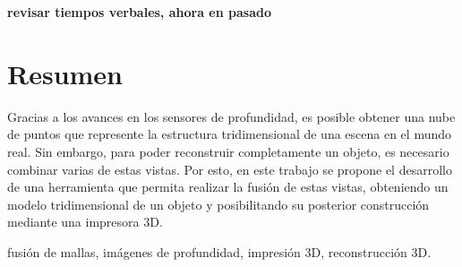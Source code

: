 \documentclass{pfc}
\subtitle{Informe final}
\newcommand{\TODO}[1]{{\color{red}\bfseries#1}}
\begin{document}
\frontmatter
\TODO{revisar tiempos verbales, ahora en pasado}
	\maketitle
	\chapter{Resumen}
		Gracias a los avances en los sensores de profundidad,
		es posible obtener una nube de puntos que represente la estructura tridimensional de una escena en el mundo real.
		Sin embargo, para poder reconstruir completamente un objeto, es necesario combinar varias de estas vistas.
		Por esto, en este trabajo se propone el desarrollo de una herramienta
		que permita realizar la fusión de estas vistas,
		obteniendo un modelo tridimensional de un objeto
		y posibilitando su posterior construcción mediante una impresora 3D.

		 fusión de mallas, imágenes de profundidad, impresión 3D, reconstrucción 3D.
	\tableofcontents
\mainmatter
	
	
	
	
	
	

	
	
\end{document}
